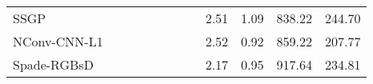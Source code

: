 \documentclass[letterpaper, 10 pt, conference]{ieeeconf}  \usepackage{geometry}
\begin{document}
\begin{table*}[t]
{\begin{tabular}{@{}lccccccccccc@{}}
			\multicolumn{1}{l|}{SSGP \cite{SSGP_Wasenmueller}}                             & \multicolumn{1}{c|}{\checkmark}                                                        & \multicolumn{1}{c|}{\checkmark}                                                              & \multicolumn{1}{c|}{\checkmark}                                                         & \multicolumn{1}{c|}{}                 & \multicolumn{1}{c|}{\checkmark}              & \multicolumn{1}{c|}{}                                                                 & \multicolumn{1}{c|}{}                                                                   & 2.51                                                                                 & 1.09                                                                                & 838.22                                                                            & 244.70                                                      \\
			\multicolumn{1}{l|}{NConv-CNN-L1 \cite{Confidence_L2}}                     & \multicolumn{1}{c|}{\checkmark}                                                        & \multicolumn{1}{c|}{\checkmark}                                                              & \multicolumn{1}{c|}{}                                                            & \multicolumn{1}{c|}{\checkmark}              & \multicolumn{1}{c|}{}                 & \multicolumn{1}{c|}{}                                                                 & \multicolumn{1}{c|}{}                                                                   & 2.52                                                                                 & 0.92                                                                                & 859.22                                                                            & 207.77                                                      \\
			\multicolumn{1}{l|}{Spade-RGBsD \cite{Sparse_Training_Spade}}                      & \multicolumn{1}{c|}{\checkmark}                                                        & \multicolumn{1}{c|}{\checkmark}                                                              & \multicolumn{1}{c|}{}                                                            & \multicolumn{1}{c|}{}                 & \multicolumn{1}{c|}{}                 & \multicolumn{1}{c|}{}                                                                 & \multicolumn{1}{c|}{}                                                                   & 2.17                                                                                 & 0.95                                                                                & 917.64                                                                            & 234.81                                                      \\

\end{tabular}}
\end{table*}
\end{document}
